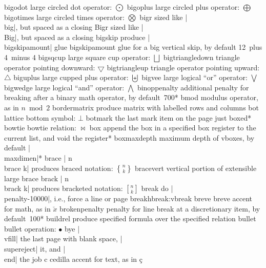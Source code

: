 \capcs bigodot {large circled dot operator: $\bigodot$}{}{}
\capcs bigoplus {large circled plus operator: $\bigoplus$}{}{}
\capcs bigotimes {large circled times operator: $\bigotimes$}{}{}
\capcs bigr {sized like |\\big|, but spaced as a closing}{}{}
\capcs Bigr {sized like |\\Big|, but spaced as a closing}{}{}
\capcs bigskip {produce |\\bigskipamount| glue}{}{}
\capcs bigskipamount {glue for a big vertical skip, by default 12\pt\
   plus 4\pt\ minus 4\pt}{}{}
\capcs bigsqcup {large square cup operator: $\bigsqcup$}{}{}
\capcs bigtriangledown {triangle operator pointing downward:
   $\bigtriangledown$}{}{}
\capcs bigtriangleup {triangle operator pointing upward: $\bigtriangleup$}{}{}
\capcs biguplus {large cupped plus operator: $\biguplus$}{}{}
\capcs bigvee {large logical ``or'' operator: $\bigvee$}{}{}
\capcs bigwedge {large logical ``and'' operator: $\bigwedge$}{}{}
\capcs binoppenalty {additional penalty for breaking after a binary math 
   operator, by default~700}*{}
\capcs bmod {modulus operator, as in $n \bmod 2$}{}{}
\capcs bordermatrix {produce matrix with labelled rows and columns}{}{}
\capcs bot {lattice bottom symbol: $\bot$}{}{}
\capcs botmark {the last mark item on the page just boxed}*{}
\capcs bowtie {bowtie relation: $\bowtie$}{}{}
\capcs box {append the box in a specified box register
   to the current list, and void the register}*{}
\capcs boxmaxdepth {maximum depth of vboxes, by default |\\maxdimen|}*{}
\capcs brace {| n\\brace k\char36| produces 
   braced notation: $n \brace k$}{}{}
\capcs bracevert {vertical portion of extensible large brace}{}{}
\capcs brack {| n\\brack k\char36| produces bracketed notation: $n \brack k$}{}{}
\capcstwo break {do |\\penalty-10000|, i.e., force a line or page
   break}{}{hbreak:vbreak}
\capcs breve {breve accent for math, as in $\breve x$}{}{}
\capcs brokenpenalty {penalty for line break at a discretionary item, by
   default~100}*{}
\capcs buildrel {produce specified formula over the specified relation}{}{}
\capcs bullet {bullet operation: $\bullet$}{}{}
\capcs bye {|\\vfill| the last page with blank space, |\\supereject| it,
   and |\\end| the job}{}{\@bye}
\capcs c {cedilla accent for text, as in \c c}{}{}
